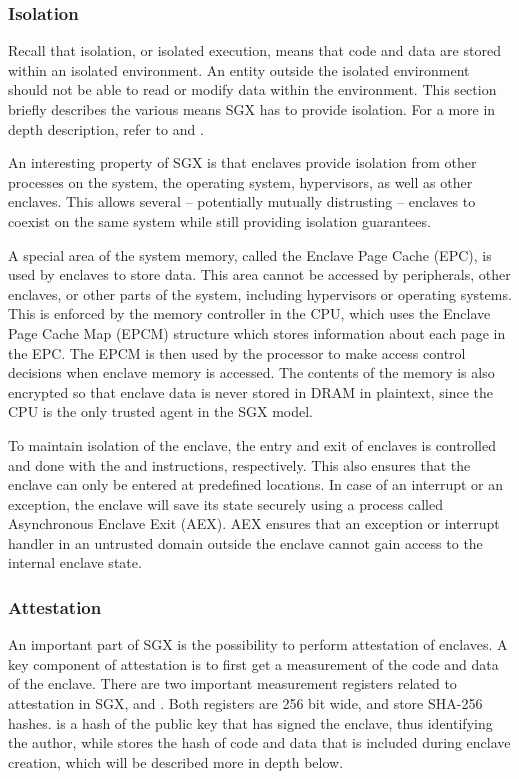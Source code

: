 \subsubsection{Isolation}

Recall that isolation, or isolated execution, means that code and data are stored within an isolated environment.
An entity outside the isolated environment should not be able to read or modify data within the environment.
This section briefly describes the various means SGX has to provide isolation.
For a more in depth description, refer to \cite{mckeen:2013} and \cite{intel64b}.

An interesting property of SGX is that enclaves provide isolation from other processes on the system, the operating system, hypervisors, as well as other enclaves.
This allows several -- potentially mutually distrusting -- enclaves to coexist on the same system while still providing isolation guarantees.

A special area of the system memory, called the Enclave Page Cache (EPC), is used by enclaves to store data.
This area cannot be accessed by peripherals, other enclaves, or other parts of the system, including hypervisors or operating systems.
This is enforced by the memory controller in the CPU, which uses the Enclave Page Cache Map (EPCM) structure which stores information about each page in the EPC.
The EPCM is then used by the processor to make access control decisions when enclave memory is accessed.
The contents of the memory is also encrypted so that enclave data is never stored in DRAM in plaintext, since the CPU is the only trusted agent in the SGX model.

To maintain isolation of the enclave, the entry and exit of enclaves is controlled and done with the \sgxenter{} and \sgxexit{} instructions, respectively.
This also ensures that the enclave can only be entered at predefined locations.
In case of an interrupt or an exception, the enclave will save its state securely using a process called Asynchronous Enclave Exit (AEX).
AEX ensures that an exception or interrupt handler in an untrusted domain outside the enclave cannot gain access to the internal enclave state.

\subsubsection{Attestation}

An important part of SGX is the possibility to perform attestation of enclaves.
A key component of attestation is to first get a measurement of the code and data of the enclave.
There are two important measurement registers related to attestation in SGX, \sgxmrenclave{} and \sgxmrsigner{}.
Both registers are 256 bit wide, and store SHA-256 hashes.
\sgxmrsigner{} is a hash of the public key that has signed the enclave, thus identifying the author, while \sgxmrenclave{} stores the hash of code and data that is included during enclave creation, which will be described more in depth below.

